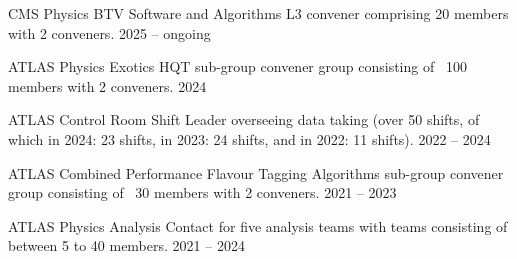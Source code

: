 


\begin{cvhonors}

  \cvhonor
    {CMS Physics BTV Software and Algorithms L3 convener} %
    {comprising 20 members with 2 conveners.} %
    {} %
    {2025 -- ongoing} %

  \cvhonor
    {ATLAS Physics Exotics HQT sub-group convener} %
    {group consisting of ~100 members with 2 conveners.} %
    {} %
    {2024} %

  \cvhonor
    {ATLAS Control Room Shift Leader} %
    {overseeing data taking (over 50 shifts, of which in 2024: 23 shifts, in 2023: 24 shifts, and in 2022: 11 shifts).} %
    {} %
    {2022 -- 2024} %

  \cvhonor
    {ATLAS Combined Performance Flavour Tagging Algorithms
    sub-group convener} %
    {group consisting of ~30 members with 2 conveners.} %
    {} %
    {2021 -- 2023} %

  \cvhonor
    {ATLAS Physics Analysis Contact} %
    {for five analysis teams with teams consisting of between 5 to 40 members.} %
    {} %
    {2021 -- 2024} %

\end{cvhonors}


